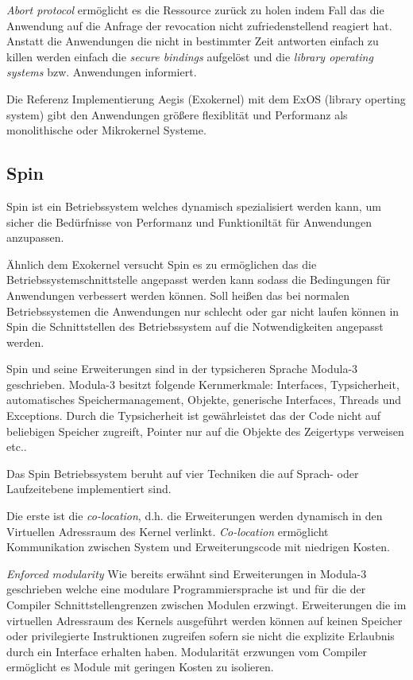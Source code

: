 \documentclass[9pt,technote]{IEEEtran}
\begin{document}
        \textit{Abort protocol} erm\"oglicht es die Ressource zur\"uck zu holen indem Fall das die Anwendung auf die
        Anfrage der revocation nicht zufriedenstellend reagiert hat.
        Anstatt die Anwendungen die nicht in bestimmter Zeit antworten einfach zu killen werden einfach die
        \textit{secure bindings} aufgel\"ost und die \textit{library operating systems} bzw.
        Anwendungen informiert.
        
        Die Referenz Implementierung Aegis (Exokernel) mit dem ExOS (library operting system) gibt den Anwendungen gr\"o\ss ere flexiblit\"at 
        und Performanz als monolithische oder Mikrokernel Systeme. 
        
        
    \subsection{Spin}
       Spin ist ein Betriebssystem welches dynamisch spezialisiert werden kann, um sicher die Bed\"urfnisse von Performanz und Funktionilt\"at f\"ur
       Anwendungen anzupassen.
    
      \"Ahnlich dem Exokernel versucht Spin es zu erm\"oglichen das die Betriebssystemschnittstelle angepasst werden kann sodass die Bedingungen 
      f\"ur Anwendungen verbessert werden k\"onnen.
      Soll hei\ss en das bei normalen Betriebssystemen die Anwendungen nur schlecht oder gar nicht laufen k\"onnen in Spin die Schnittstellen 
      des Betriebssystem auf die Notwendigkeiten angepasst werden.
      
      Spin und seine Erweiterungen sind in der typsicheren Sprache Modula-3 geschrieben. Modula-3 besitzt folgende Kernmerkmale: 
      Interfaces, Typsicherheit, automatisches Speichermanagement,
      Objekte, generische Interfaces, Threads und Exceptions. Durch die Typsicherheit ist gew\"ahrleistet das der Code nicht auf beliebigen Speicher zugreift,
      Pointer nur auf die Objekte des Zeigertyps verweisen etc..
      
      Das Spin Betriebssystem beruht auf vier Techniken die auf Sprach- oder Laufzeitebene implementiert sind.
      
      Die erste ist die \textit{co-location}, d.h. die Erweiterungen werden dynamisch in den Virtuellen Adressraum des Kernel verlinkt.
      \textit{Co-location} erm\"oglicht Kommunikation zwischen System und Erweiterungscode mit niedrigen Kosten.
      
      \textit{Enforced modularity}  Wie bereits erw\"ahnt sind Erweiterungen in Modula-3 geschrieben welche eine modulare
      Programmiersprache ist und f\"ur die der Compiler Schnittstellengrenzen zwischen Modulen erzwingt.
      Erweiterungen die im virtuellen Adressraum des Kernels ausgef\"uhrt werden k\"onnen auf keinen Speicher oder privilegierte Instruktionen 
      zugreifen sofern sie nicht
      die explizite Erlaubnis durch ein Interface erhalten haben. Modularit\"at erzwungen vom Compiler erm\"oglicht es Module mit geringen Kosten zu isolieren.
      
\end{document}
